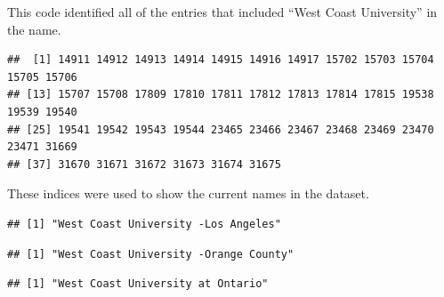 \documentclass[
]{article}
\newenvironment{Shaded}{\begin{snugshade}}{\end{snugshade}}
\newcommand{\DecValTok}[1]{\textcolor[rgb]{0.00,0.00,0.81}{#1}}
\newcommand{\KeywordTok}[1]{\textcolor[rgb]{0.13,0.29,0.53}{\textbf{#1}}}
\newcommand{\NormalTok}[1]{#1}
\newcommand{\OperatorTok}[1]{\textcolor[rgb]{0.81,0.36,0.00}{\textbf{#1}}}
\newcommand{\StringTok}[1]{\textcolor[rgb]{0.31,0.60,0.02}{#1}}
\begin{document}
This code identified all of the entries that included ``West Coast
University'' in the name.

\begin{Shaded}
\end{Shaded}

\begin{verbatim}
##  [1] 14911 14912 14913 14914 14915 14916 14917 15702 15703 15704 15705 15706
## [13] 15707 15708 17809 17810 17811 17812 17813 17814 17815 19538 19539 19540
## [25] 19541 19542 19543 19544 23465 23466 23467 23468 23469 23470 23471 31669
## [37] 31670 31671 31672 31673 31674 31675
\end{verbatim}

These indices were used to show the current names in the dataset.

\begin{Shaded}
\end{Shaded}

\begin{verbatim}
## [1] "West Coast University -Los Angeles"
\end{verbatim}

\begin{Shaded}
\end{Shaded}

\begin{verbatim}
## [1] "West Coast University -Orange County"
\end{verbatim}

\begin{Shaded}
\end{Shaded}

\begin{verbatim}
## [1] "West Coast University at Ontario"
\end{verbatim}
\end{document}
